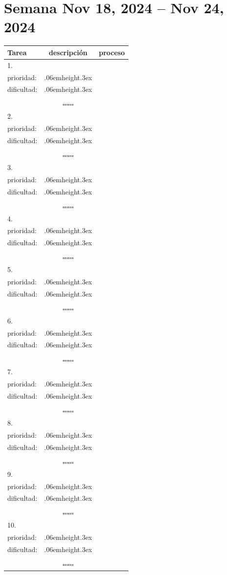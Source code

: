 \documentclass[a4paper,12pt, tikz]{scrartcl}
\newcommand\Vtextvisiblespace[1][.3em]{%
  \mbox{\kern.06em\vrule height.3ex}%
  \vbox{\hrule width#1}%
  \hbox{\vrule height.3ex}}
\newcommand{\subtablaDescrip}{ \begin{tabular}{ll}&\\ prioridad: & \Vtextvisiblespace[2em] \\ dificultad: & \Vtextvisiblespace[2em]\\&\\ \end{tabular}}
\begin{document}
\section*{Semana Nov 18, 2024 -- Nov 24, 2024}
\thispagestyle{empty}
\noindent
\begin{tabularx}{\linewidth}{|X|c c|}
    \hline
  \textbf{Tarea} & \textbf{descripción} & \textbf{proceso}\\
  \hline
   1.\vspace{4ex} &      \subtablaDescrip     & $\square\square\square\square\square$ \\
  \hline
  2.\vspace{4ex} &      \subtablaDescrip     & $\square\square\square\square\square$ \\
  \hline
  3.\vspace{4ex} &      \subtablaDescrip     & $\square\square\square\square\square$ \\
  \hline
  4.\vspace{4ex} &      \subtablaDescrip     & $\square\square\square\square\square$ \\
  \hline
  5.\vspace{4ex} &      \subtablaDescrip     & $\square\square\square\square\square$ \\
  \hline
  6.\vspace{4ex} &      \subtablaDescrip     & $\square\square\square\square\square$ \\
  \hline
  7.\vspace{4ex} &      \subtablaDescrip     & $\square\square\square\square\square$ \\
  \hline
  8.\vspace{4ex} &      \subtablaDescrip     & $\square\square\square\square\square$ \\
  \hline
  9.\vspace{4ex} &      \subtablaDescrip     & $\square\square\square\square\square$ \\
  \hline
  10.\vspace{4ex} &      \subtablaDescrip     & $\square\square\square\square\square$ \\
  \hline
\end{tabularx}

\newpage
\end{document}
